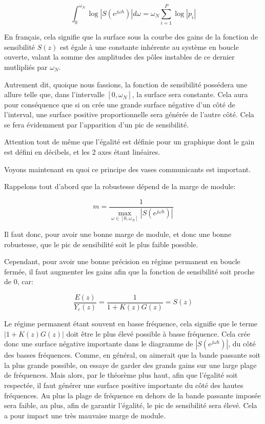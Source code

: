 \documentclass[11pt]{article}
\begin{document}
\[ \int_0^{\omega_N} \log \left| S(e^{j\omega h})\right| d\omega = \omega_N \sum_{i=1}^{P} \log |p_i| \]

    En français, cela signifie que la surface sous la courbe des gains de la
fonction de sensibilité \(S(z)\) est égale à une constante inhérente au
système en boucle ouverte, valant la somme des amplitudes des pôles
instables de ce dernier mutlipliés par \(\omega_N\).

Autrement dit, quoique nous fassions, la fonction de sensibilité
possédera une allure telle que, dans l'intervalle \([0, \omega_N]\), la
surface sera constante. Cela aura pour conséquence que si on crée une
grande surface négative d'un côté de l'interval, une surface positive
proportionnelle sera générée de l'autre côté. Cela se fera évidemment
par l'apparition d'un pic de sensibilité.

Attention tout de même que l'égalité est définie pour un graphique dont
le gain est défini en décibels, et les 2 axes étant linéaires.

    Voyons maintenant en quoi ce principe des vases communicants est
important.

    Rappelons tout d'abord que la robustesse dépend de la marge de module:

\[ m = \frac{1}{\max_{\omega \in [0, \omega_N]} \left| S(e^{j\omega h})\right|} \]

Il faut donc, pour avoir une bonne marge de module, et donc une bonne
robustesse, que le pic de sensibilité soit le plus faible possible.

    Cependant, pour avoir une bonne précision en régime permanent en boucle
fermée, il faut augmenter les gains afin que la fonction de sensibilité
soit proche de 0, car:

\[ \frac{E(z)}{Y_c(z)} = \frac{1}{1+K(z)G(z)} = S(z) \]

    Le régime permanent étant souvent en basse fréquence, cela signifie que
le terme \(\left| 1 + K(z)G(z) \right|\) doit être le plus élevé
possible à basse fréquence. Cela crée donc une surface négative
importante dans le diagramme de \(\left| S(e^{j\omega h}) \right|\), du
côté des basses fréquences. Comme, en général, on aimerait que la bande
passante soit la plus grande possible, on essaye de garder des grands
gains sur une large plage de fréquences. Mais alors, par le théorème
plus haut, afin que l'égalité soit respectée, il faut générer une
surface positive importante du côté des hautes fréquences. Au plus la
plage de fréquence en dehors de la bande passante imposée sera faible,
au plus, afin de garantir l'égalité, le pic de sensibilité sera élevé.
Cela a pour impact une très mauvaise marge de module.
\end{document}
